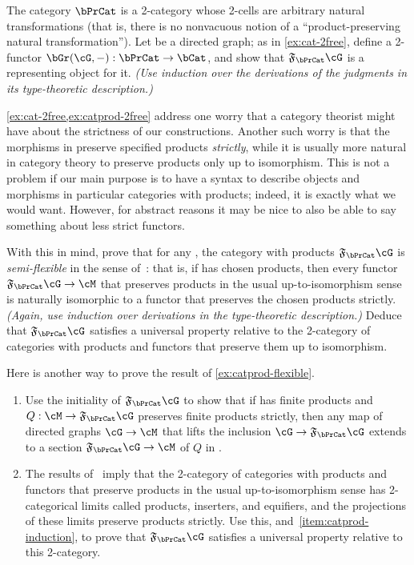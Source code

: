 \documentclass{book}
\newcommand{\F}[1]{\mathfrak{F}_{#1}}
\begin{document}
\begin{ex}\label{ex:catprod-2free}
  The category $\bPrCat$ is a 2-category whose 2-cells are arbitrary natural transformations (that is, there is no nonvacuous notion of a ``product-preserving natural transformation'').
  Let \cG be a directed graph; as in \cref{ex:cat-2free}, define a 2-functor $\bGr(\cG,-):\bPrCat\to\bCat$, and show that $\F\bPrCat\cG$ is a representing object for it.
  \textit{(Use induction over the derivations of the judgments in its type-theoretic description.)}
\end{ex}

\begin{ex}\label{ex:catprod-flexible}
  \cref{ex:cat-2free,ex:catprod-2free} address one worry that a category theorist might have about the strictness of our constructions.
  Another such worry is that the morphisms in \bPrCat preserve specified products \emph{strictly}, while it is usually more natural in category theory to preserve products only up to isomorphism.
  This is not a problem if our main purpose is to have a syntax to describe objects and morphisms in particular categories with products; indeed, it is exactly what we would want.
  However, for abstract reasons it may be nice to also be able to say something about less strict functors.

  With this in mind, prove that for any \cG, the category with products $\F\bPrCat\cG$ is \emph{semi-flexible} in the sense of~\cite{bkp:2dmonads}: that is, if \cM has chosen products, then every functor $\F\bPrCat\cG \to \cM$ that preserves products in the usual up-to-isomorphism sense is naturally isomorphic to a functor that preserves the chosen products strictly.
  \textit{(Again, use induction over derivations in the type-theoretic description.)}
  Deduce that $\F\bPrCat\cG$ satisfies a universal property relative to the 2-category of categories with products and functors that preserve them up to isomorphism.
\end{ex}

\begin{ex}\label{ex:catprod-induction}
  Here is another way to prove the result of \cref{ex:catprod-flexible}.
  \begin{enumerate}
  \item Use the initiality of $\F\bPrCat\cG$ to show that if \cM has finite products and $Q:\cM\to \F\bPrCat\cG$ preserves finite products strictly, then any map of directed graphs $\cG \to \cM$ that lifts the inclusion $\cG \to \F\bPrCat\cG$ extends to a section $\F\bPrCat\cG \to \cM$ of $Q$ in \bPrCat.\label{item:catprod-induction}
  \item The results of~\cite{bkp:2dmonads} imply that the 2-category of categories with products and functors that preserve products in the usual up-to-isomorphism sense has 2-categorical limits called products, inserters, and equifiers, and the projections of these limits preserve products strictly.
    Use this, and~\ref{item:catprod-induction}, to prove that $\F\bPrCat\cG$ satisfies a universal property relative to this 2-category.
  \end{enumerate}
\end{ex}
\end{document}

